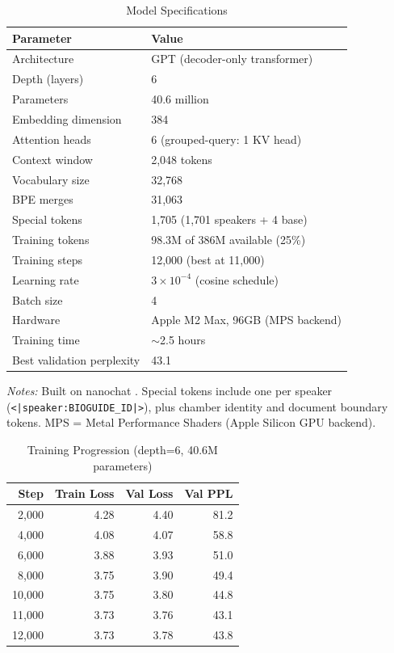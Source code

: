 \documentclass[12pt]{article}
\begin{document}
\begin{table}[H]
\centering
\caption{Model Specifications}
\label{tab:model}
\begin{threeparttable}
\begin{tabular}{ll}
\toprule
Parameter & Value \\
\midrule
Architecture & GPT (decoder-only transformer) \\
Depth (layers) & 6 \\
Parameters & 40.6 million \\
Embedding dimension & 384 \\
Attention heads & 6 (grouped-query: 1 KV head) \\
Context window & 2,048 tokens \\
Vocabulary size & 32,768 \\
\quad BPE merges & 31,063 \\
\quad Special tokens & 1,705 (1,701 speakers + 4 base) \\
\midrule
Training tokens & 98.3M of 386M available (25\%) \\
Training steps & 12,000 (best at 11,000) \\
Learning rate & $3 \times 10^{-4}$ (cosine schedule) \\
Batch size & 4 \\
Hardware & Apple M2 Max, 96GB (MPS backend) \\
Training time & $\sim$2.5 hours \\
Best validation perplexity & 43.1 \\
\bottomrule
\end{tabular}
\begin{tablenotes}[flushleft]
\small
\item \textit{Notes:} Built on nanochat \citep{karpathy2025}. Special tokens include one per speaker (\texttt{<|speaker:BIOGUIDE\_ID|>}), plus chamber identity and document boundary tokens. MPS = Metal Performance Shaders (Apple Silicon GPU backend).
\end{tablenotes}
\end{threeparttable}
\end{table}

\begin{table}[H]
\centering
\caption{Training Progression (depth=6, 40.6M parameters)}
\label{tab:training}
\begin{tabular}{rrrr}
\toprule
Step & Train Loss & Val Loss & Val PPL \\
\midrule
2,000 & 4.28 & 4.40 & 81.2 \\
4,000 & 4.08 & 4.07 & 58.8 \\
6,000 & 3.88 & 3.93 & 51.0 \\
8,000 & 3.75 & 3.90 & 49.4 \\
10,000 & 3.75 & 3.80 & 44.8 \\
11,000 & 3.73 & 3.76 & 43.1 \\
12,000 & 3.73 & 3.78 & 43.8 \\
\bottomrule
\end{tabular}
\end{table}
\end{document}
